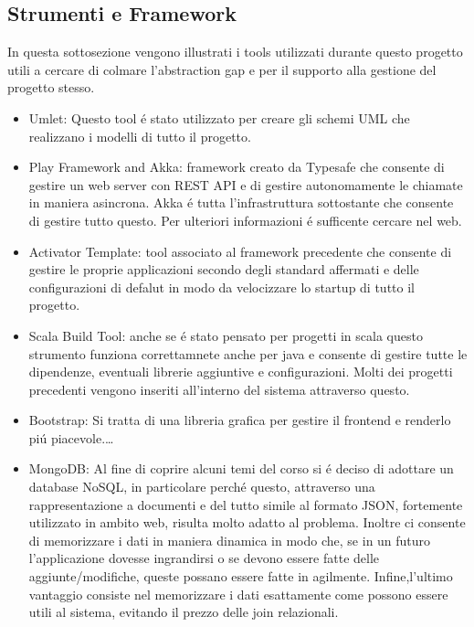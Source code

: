 \subsection{Strumenti e Framework}

In questa sottosezione vengono illustrati i tools utilizzati durante questo progetto utili a cercare di colmare l'abstraction gap e per il supporto alla gestione del progetto stesso.

\begin{itemize}
 \item {Umlet:} Questo tool \'e stato utilizzato per creare gli schemi UML che realizzano i modelli di tutto il progetto.\cite{Umlet}
 \item {Play Framework and Akka:} framework creato da Typesafe che consente di gestire un web server con REST API e di gestire autonomamente le chiamate in maniera asincrona. Akka \'e tutta l'infrastruttura sottostante che consente di gestire tutto questo. Per ulteriori informazioni \'e sufficente cercare nel web.\cite{Akka,PlayFramework}
 \item {Activator Template:} tool associato al framework precedente che consente di gestire le proprie applicazioni secondo degli standard affermati e delle configurazioni di defalut in modo da velocizzare lo startup di tutto il progetto.\cite{Activator&SBT}
 \item {Scala Build Tool:} anche se \'e stato pensato per progetti in scala questo strumento funziona correttamnete anche per java e consente di gestire tutte le dipendenze, eventuali librerie aggiuntive e configurazioni. Molti dei progetti precedenti vengono inseriti all'interno del sistema attraverso questo.\cite{Activator&SBT}
\item {Bootstrap:} Si tratta di una libreria grafica per gestire il frontend e renderlo pi\'u piacevole.\ldots
 \item {MongoDB:} Al fine di coprire alcuni temi del corso si \'e deciso di adottare un database NoSQL, in particolare perch\'e questo, attraverso una rappresentazione a documenti e del tutto simile al formato JSON, fortemente utilizzato in ambito web, risulta molto adatto al problema. Inoltre ci consente di memorizzare i dati in maniera dinamica in modo che, se in un futuro l'applicazione dovesse ingrandirsi o se devono essere fatte delle aggiunte/modifiche, queste possano essere fatte in agilmente. Infine,l'ultimo vantaggio consiste nel memorizzare i dati esattamente come possono essere utili al sistema, evitando il prezzo delle join relazionali. \cite{MongoDB}

\end{itemize}
